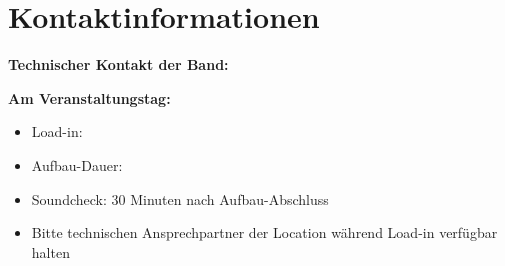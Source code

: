 \documentclass[standard]{techrider}  %
\begin{document}

\section{Kontaktinformationen}

\textbf{Technischer Kontakt der Band:}\\
\printcontactinfo

\textbf{Am Veranstaltungstag:}
\begin{itemize}
    \item Load-in: \printloadintime
    \item Aufbau-Dauer: \printsetuptime
    \item Soundcheck: 30 Minuten nach Aufbau-Abschluss
    \item Bitte technischen Ansprechpartner der Location während Load-in verfügbar halten
\end{itemize}
\end{document}
